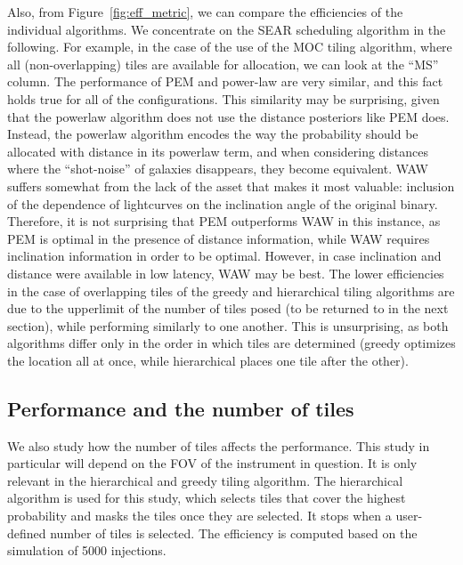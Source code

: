 \documentclass[twocolumn]{aastex62}
\begin{document}
Also, from Figure~\ref{fig:eff_metric}, we can compare the efficiencies of the individual algorithms.
We concentrate on the SEAR scheduling algorithm in the following. For example, in the case of the use of the MOC tiling algorithm, where all (non-overlapping) tiles are available for allocation, we can look at the ``MS'' column. The performance of PEM and power-law are very similar, and this fact holds true for all of the configurations. This similarity may be surprising, given that the powerlaw algorithm does not use the distance posteriors like PEM does. Instead, the powerlaw algorithm encodes the way the probability should be allocated with distance in its powerlaw term, and when considering distances where the ``shot-noise'' of galaxies disappears, they become equivalent. WAW suffers somewhat from the lack of the asset that makes it most valuable: inclusion of the dependence of lightcurves on the inclination angle of the original binary. Therefore, it is not surprising that PEM outperforms WAW in this instance, as PEM is optimal in the presence of distance information, while WAW requires inclination information in order to be optimal. However, in case inclination and distance were available in low latency, WAW may be best.
The lower efficiencies in the case of overlapping tiles of the greedy and hierarchical tiling algorithms are due to the upperlimit of the number of tiles posed (to be returned to in the next section), while performing similarly to one another. This is unsurprising, as both algorithms differ only in the order in which tiles are determined (greedy optimizes the location all at once, while hierarchical places one tile after the other).

\subsection{Performance and the number of tiles}

We also study how the number of tiles affects the performance. This study in particular will depend on the FOV of the instrument in question. It is only relevant in the hierarchical and greedy tiling algorithm. The hierarchical algorithm is used for this study, which selects tiles that cover the highest probability and masks the tiles once they are selected. It stops when a user-defined number of tiles is selected. The efficiency is computed based on the simulation of 5000 injections.
\end{document}
